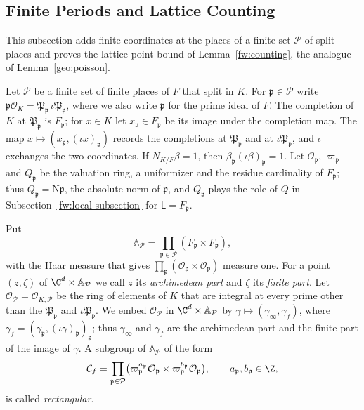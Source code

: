 \subsection{Finite Periods and Lattice Counting}

This subsection adds finite coordinates at the places of a finite set
$\mathcal P$ of split places and proves the lattice-point bound of
Lemma~\ref{fw:counting}, the analogue of Lemma~\ref{geo:poisson}.

Let $\mathcal P$ be a finite set of finite places of $F$ that split in
$K$. For $\mathfrak p\in\mathcal P$ write $\mathfrak p\mathcal
O_K=\mathfrak P_{\mathfrak p}\,\iota\mathfrak P_{\mathfrak p}$, where we
also write $\mathfrak p$ for the prime ideal of $F$. The completion of
$K$ at $\mathfrak P_{\mathfrak p}$ is $F_{\mathfrak p}$; for $x\in K$ let
$x_{\mathfrak p}\in F_{\mathfrak p}$ be its image under the completion
map. The map $x\mapsto(x_{\mathfrak p},(\iota x)_{\mathfrak p})$ records
the completions at $\mathfrak P_{\mathfrak p}$ and at $\iota\mathfrak
P_{\mathfrak p}$, and $\iota$ exchanges the two coordinates. If
$N_{K/F}\beta=1$, then $\beta_{\mathfrak p}(\iota\beta)_{\mathfrak p}=1$.
Let $\mathcal O_{\mathfrak p}$, $\varpi_{\mathfrak p}$ and $Q_{\mathfrak
p}$ be the valuation ring, a uniformizer and the residue cardinality of
$F_{\mathfrak p}$; thus $Q_{\mathfrak p}=\mathrm N\mathfrak p$, the absolute norm of
$\mathfrak p$, and $Q_{\mathfrak p}$ plays the role of $Q$ in
Subsection~\ref{fw:local-subsection} for $\mathsf L=F_{\mathfrak p}$.

\begin{definition}\label{fw:finite-coordinates}
Put
\[
 \mathbb A_{\mathcal P}=\prod_{\mathfrak p\in\mathcal P}
 (F_{\mathfrak p}\times F_{\mathfrak p}),
\]
with the Haar measure that gives $\prod_{\mathfrak p}(\mathcal
O_{\mathfrak p}\times\mathcal O_{\mathfrak p})$ measure one. For a point
$(z,\zeta)$ of $\C^d\times\mathbb A_{\mathcal P}$ we call $z$ its
\emph{archimedean part} and $\zeta$ its \emph{finite part}. Let
$\mathcal O_{\mathcal P}=\mathcal O_{K,\mathcal P}$ be the ring of elements of $K$
that are integral at every prime other than the $\mathfrak P_{\mathfrak p}$
and $\iota\mathfrak P_{\mathfrak p}$. We embed $\mathcal O_{\mathcal P}$ in
$\C^d\times\mathbb A_{\mathcal P}$ by
$\gamma\mapsto(\gamma_\infty,\gamma_f)$, where
$\gamma_f=(\gamma_{\mathfrak p},(\iota\gamma)_{\mathfrak p})_{\mathfrak
p}$; thus $\gamma_\infty$ and $\gamma_f$ are the archimedean part and the
finite part of the image of $\gamma$. A subgroup of $\mathbb A_{\mathcal
P}$ of the form
\[
 \mathcal C_f=\prod_{\mathfrak p\in\mathcal P}\bigl(\varpi_{\mathfrak
 p}^{a_{\mathfrak p}}\mathcal O_{\mathfrak p}\times\varpi_{\mathfrak
 p}^{b_{\mathfrak p}}\mathcal O_{\mathfrak p}\bigr),\qquad
 a_{\mathfrak p},b_{\mathfrak p}\in\Z,
\]
is called \emph{rectangular}.
\end{definition}

